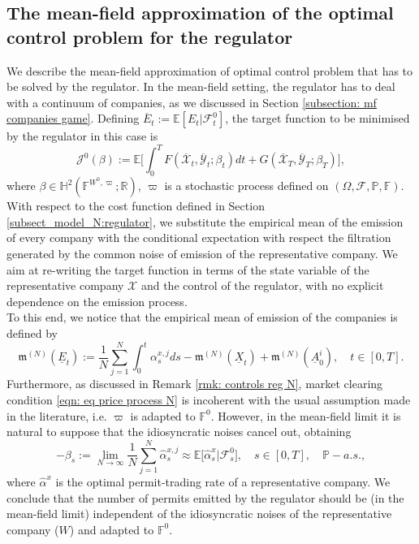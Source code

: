 \documentclass[11pt,twoside]{amsart}
\theoremstyle{definition}
\numberwithin{equation}{section}
\newcommand{\w}{\varpi}
\newcommand{\E}{\mathbb{E}}
\newcommand{\F}{\mathbb{F}}
\newcommand{\R}{\mathbb{R}}
\newcommand{\ItF}{\mathcal{F}}
\newcommand{\prob}{\mathbb{P}}
\renewcommand{\bar}{\overline}
\renewcommand{\hat}{\widehat}
\begin{document}
\subsection{The mean-field approximation of the optimal control problem for the regulator}\label{subsection_mfg_regulator}
We describe the mean-field approximation of optimal control problem that has to be solved by the regulator. In the mean-field setting, the regulator has to deal with a continuum of companies, as we discussed in Section \ref{subsection: mf companies game}. Defining $\overline{E}_t := \mathbb{E}[E_t|\ItF^0_t]$, the target function to be minimised by the regulator in this case is
\begin{equation*}
\mathcal{J}^0(\beta) := \mathbb{E} \bigg[ \int_0^TF( \bar{\mathcal{X}}_t,  \bar{\mathcal{Y}}_t; \beta_t) dt + G(  \bar{\mathcal{X}}_T ,\bar{\mathcal{Y}}_T; \beta_T)\bigg],
\end{equation*} 
where $\beta\in \mathbb{H}^2(\F^{W^0,\w};\R)$, $\w$ is a stochastic process defined on $(\Omega,\ItF, \prob,\F)$. With respect to the cost function defined in Section \ref{subsect_model_N:regulator}, we substitute the empirical mean of the emission of every company with the conditional expectation with respect the filtration generated by the common noise of emission of the representative company. We aim at re-writing the target function in terms of the state variable of the representative company $\mathcal{X}$ and the control of the regulator, with no explicit dependence on the emission process. 
\\
To this end, we notice that the empirical mean of emission of the companies is defined by 
\begin{equation*}
\mathfrak{m}^{(N)}(\underline{E}_t) :=\frac{1}{N} \sum_{j = 1}^N \int_0^t\alpha^{x,j}_sds - \mathfrak{m}^{(N)}(\underline{X}_t) + \mathfrak{m}^{(N)}(\underline{A}^i_0),\quad t\in[0,T].
\end{equation*}
Furthermore, as discussed in Remark \ref{rmk: controls reg N}, market clearing condition \eqref{eqn: eq price process N} is incoherent with the usual assumption made in the literature, i.e. $\w$ is adapted to $\F^0$. However, in the mean-field limit it is natural to suppose that the idiosyncratic noises cancel out, obtaining
\begin{equation}
\label{eqn: mf market clearing} 
-\beta_s := \lim_{N\to\infty} \frac{1}{N}\sum_{j = 1}^N\hat\alpha^{x,j}_s \approx \E\big[\hat{\alpha}^{x}_s |\ItF^0_s\big],\quad s\in[0,T],\quad \prob-a.s.,
\end{equation}
where $\hat\alpha^x$ is the optimal permit-trading rate of a representative company. We conclude that the number of permits emitted by the regulator should be (in the mean-field limit) independent of the idiosyncratic noises of the representative company ($W$) and adapted to $\F^0$. 
\end{document}
